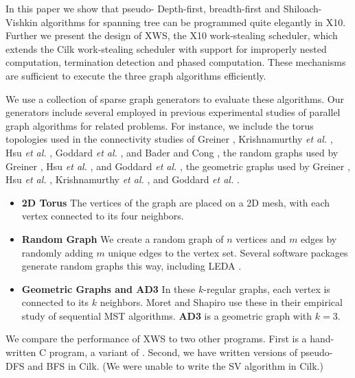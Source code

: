 \documentclass[10pt]{article}
\numberwithin{equation}{section}
\def\Xten{{\sf X10}}
\def\XWS{{\sf XWS}}
\begin{document}
In this paper we show that pseudo- Depth-first, breadth-first and
Shiloach-Vishkin algorithms for spanning tree can be programmed quite
elegantly in \Xten. Further we present the design of \XWS, the \Xten{}
work-stealing scheduler, which extends the Cilk work-stealing
scheduler with support for improperly nested computation, termination
detection and phased computation. These mechanisms are sufficient to
execute the three graph algorithms efficiently. 


We use a collection of sparse graph generators to evaluate these algorithms.
Our generators include several employed in previous
experimental studies of parallel graph algorithms for related
problems. For instance, we include the torus topologies used in the
connectivity studies of Greiner \cite{Gre94}, Krishnamurthy \emph{et
al.} \cite{KLC97}, Hsu \emph{et al.} \cite{HRD97}, Goddard \emph{et
al.} \cite{GKP97}, and Bader and Cong \cite{BC04b}, the random graphs
used by Greiner \cite{Gre94}, Hsu \emph{et al.}  \cite{HRD97}, and
Goddard \emph{et al.} \cite{GKP97}, the geometric graphs used by
Greiner \cite{Gre94}, Hsu \emph{et al.} \cite{HRD97}, Krishnamurthy
\emph{et al.} \cite{KLC97}, and Goddard \emph{et al.} \cite{GKP97}.

\begin{itemize}
\itemsep0pt

\item \textbf{2D Torus} The vertices of the graph are placed on a 2D
  mesh, with each vertex connected to its four neighbors.  

\item \textbf{Random Graph} We create a random graph of $n$ vertices
  and $m$ edges by randomly adding $m$ unique edges to the vertex
  set. Several software packages generate random graphs this way,
  including LEDA \cite{MN99}.
  
\item \textbf{Geometric Graphs and AD3} In these $k$-regular graphs,
  each vertex is connected to its $k$ %
  neighbors.  Moret and Shapiro \cite{MS94} use these
  in their empirical study of sequential MST algorithms. \textbf{AD3}
  is a geometric graph with $k=3$.  
\end{itemize}

We compare the performance of \XWS{} to two other programs. First is a
hand-written C program, a variant of \cite{BC04a}. Second, we have
written versions of pseudo-DFS and BFS in Cilk. (We were unable to
write the SV algorithm in Cilk.)
\end{document}
